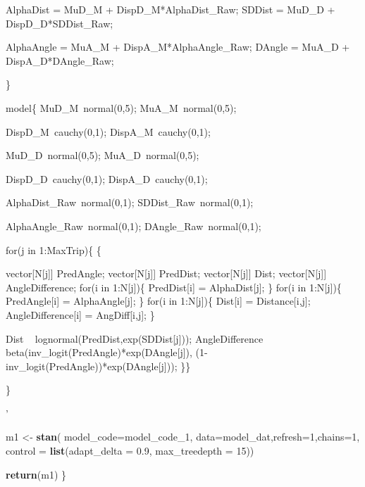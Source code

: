 \documentclass[
]{article}
\newenvironment{Shaded}{\begin{snugshade}}{\end{snugshade}}
\newcommand{\DataTypeTok}[1]{\textcolor[rgb]{0.13,0.29,0.53}{#1}}
\newcommand{\DecValTok}[1]{\textcolor[rgb]{0.00,0.00,0.81}{#1}}
\newcommand{\FloatTok}[1]{\textcolor[rgb]{0.00,0.00,0.81}{#1}}
\newcommand{\KeywordTok}[1]{\textcolor[rgb]{0.13,0.29,0.53}{\textbf{#1}}}
\newcommand{\NormalTok}[1]{#1}
\newcommand{\StringTok}[1]{\textcolor[rgb]{0.31,0.60,0.02}{#1}}
\begin{document}
\begin{Shaded}
\begin{Highlighting}[]
{\StringTok{ AlphaDist = MuD_M + DispD_M*AlphaDist_Raw;}
\StringTok{ SDDist = MuD_D + DispD_D*SDDist_Raw;}

\StringTok{ AlphaAngle = MuA_M + DispA_M*AlphaAngle_Raw;}
\StringTok{ DAngle = MuA_D + DispA_D*DAngle_Raw;  }

\StringTok{\}}

\StringTok{model\{}
\StringTok{  MuD_M~normal(0,5); }
\StringTok{  MuA_M~normal(0,5); }

\StringTok{  DispD_M~cauchy(0,1); }
\StringTok{  DispA_M~cauchy(0,1); }

\StringTok{  MuD_D~normal(0,5); }
\StringTok{  MuA_D~normal(0,5); }

\StringTok{  DispD_D~cauchy(0,1); }
\StringTok{  DispA_D~cauchy(0,1); }

\StringTok{  AlphaDist_Raw~normal(0,1); }
\StringTok{  SDDist_Raw~normal(0,1); }

\StringTok{  AlphaAngle_Raw~normal(0,1); }
\StringTok{  DAngle_Raw~normal(0,1); }

\StringTok{for(j in 1:MaxTrip)\{}
\StringTok{\{}

\StringTok{ vector[N[j]] PredAngle;}
\StringTok{ vector[N[j]] PredDist;}
\StringTok{ vector[N[j]] Dist;}
\StringTok{ vector[N[j]] AngleDifference;}
\StringTok{  }
\StringTok{ for(i in 1:N[j])\{}
\StringTok{  PredDist[i] = AlphaDist[j]; }
\StringTok{  \} }
\StringTok{        }
\StringTok{ for(i in 1:N[j])\{}
\StringTok{  PredAngle[i] = AlphaAngle[j]; }
\StringTok{  \}       }
\StringTok{              }
\StringTok{ for(i in 1:N[j])\{            }
\StringTok{  Dist[i] = Distance[i,j];              }
\StringTok{  AngleDifference[i] = AngDiff[i,j];}
\StringTok{  \}}

\StringTok{ Dist ~ lognormal(PredDist,exp(SDDist[j]));}
\StringTok{ AngleDifference ~ beta(inv_logit(PredAngle)*exp(DAngle[j]), (1-inv_logit(PredAngle))*exp(DAngle[j]));}
\StringTok{ \}\}    }

\StringTok{\}}

\StringTok{'}

\NormalTok{ m1 <-}\StringTok{ }\KeywordTok{stan}\NormalTok{( }\DataTypeTok{model_code=}\NormalTok{model_code_}\DecValTok{1}\NormalTok{, }\DataTypeTok{data=}\NormalTok{model_dat,}\DataTypeTok{refresh=}\DecValTok{1}\NormalTok{,}\DataTypeTok{chains=}\DecValTok{1}\NormalTok{, }\DataTypeTok{control =} \KeywordTok{list}\NormalTok{(}\DataTypeTok{adapt_delta =} \FloatTok{0.9}\NormalTok{, }\DataTypeTok{max_treedepth =} \DecValTok{15}\NormalTok{))}

 \KeywordTok{return}\NormalTok{(m1)}
\NormalTok{\}}



}
\end{Highlighting}
\end{Shaded}
\end{document}
